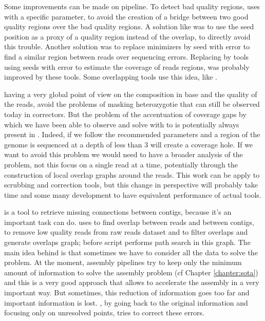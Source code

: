 \documentclass[main.tex]{subfiles}
\begin{document}
Some improvements can be made on \yacrd pipeline. To detect bad quality regions, \yacrd uses \minimap with a specific parameter, to avoid the creation of a bridge between two good quality regions over the bad quality regions. A solution like \miniscrub was to use the seed position as a proxy of a quality region instead of the overlap, to directly avoid this trouble. Another solution was to replace minimizers by seed with error to find a similar region between reads over sequencing errors. Replacing \minimap by tools using seeds with error to estimate the coverage of reads regions, was probably improved by these tools. Some overlapping tools use this idea, like \cite{GroupK}.

\yacrd having a very global point of view on the composition in base and the quality of the reads, avoid the problems of masking heterozygotie that can still be observed today in correctors. But the problem of the accentuation of coverage gaps by which we have been able to observe and solve with to \knot is potentially always present in \yacrd. Indeed, if we follow the recommended parameters and a region of the genome is sequenced at a depth of less than 3 \yacrd will create a coverage hole. If we want to avoid this problem we would need to have a broader analysis of the problem, not this focus on a single read at a time, potentially through the construction of local overlap graphs around the reads. This work can be apply to scrubbing and correction tools, but this change in perspective will probably take time and some many development to have equivalent performance of actual tools.

\knot is a tool to retrieve missing connections between contigs, because it's an important task \knot can do. \knot uses \minimap to find overlap between reads and between contigs, \yacrd to remove low quality reads from raw reads dataset and \fpa to filter overlaps and generate overlaps graph; before \knot script performs path search in this graph. The main idea behind \knot is that sometimes we have to consider all the data to solve the problem. At the moment, assembly pipelines try to keep only the minimum amount of information to solve the assembly problem (cf Chapter \ref{chapter:sota}) and this is a very good approach that allows to accelerate the assembly in a very important way. But sometimes, this reduction of information goes too far and important information is lost. \knot, by going back to the original information and focusing only on unresolved points, tries to correct these errors.
\end{document}
